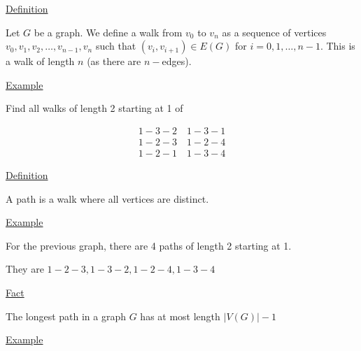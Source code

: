 \documentclass{article}
\begin{document}
\underline{Definition}

Let $G$ be a graph. We define a walk from $v_0$ to $v_n$ as a sequence of vertices $v_0, v_1, v_2, \ldots, v_{n-1}, v_n$ such that $(v_i, v_{i+1}) \in E(G)$ for $i = 0,1,\ldots,n-1$. This is a walk of length $n$ (as there are $n-$edges). 

\underline{Example}

Find all walks of length 2 starting at 1 of 

\begin{center}
\end{center}

\begin{align*}
    1 - 3 -2 \quad 1 - 3 -1 \\
    1 - 2 -3 \quad 1 -2- 4 \\
    1-2-1 \quad 1-3-4
\end{align*}

\underline{Definition}

A path is a walk where all vertices are distinct. 

\underline{Example}

For the previous graph, there are 4 paths of length 2 starting at 1. 

They are $1-2-3, 1-3-2, 1-2-4, 1-3-4$

\underline{Fact}

The longest path in a graph $G$ has at most length $|V(G)| -1$

\underline{Example}

\begin{center}
\end{center}
\end{document}
